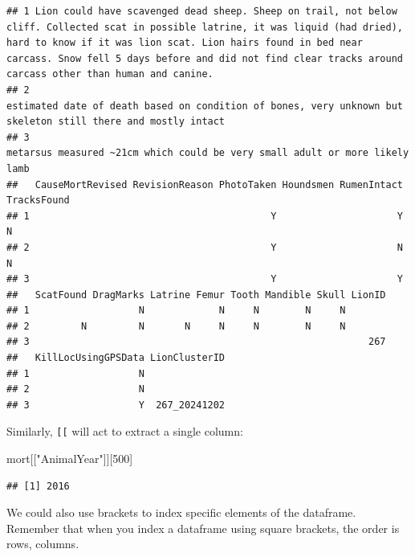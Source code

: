 \documentclass[
]{book}
\newenvironment{Shaded}{\begin{snugshade}}{\end{snugshade}}
\newcommand{\DecValTok}[1]{\textcolor[rgb]{0.00,0.00,0.81}{#1}}
\newcommand{\NormalTok}[1]{#1}
\newcommand{\StringTok}[1]{\textcolor[rgb]{0.31,0.60,0.02}{#1}}
\begin{document}
\begin{verbatim}
## 1 Lion could have scavenged dead sheep. Sheep on trail, not below cliff. Collected scat in possible latrine, it was liquid (had dried), hard to know if it was lion scat. Lion hairs found in bed near carcass. Snow fell 5 days before and did not find clear tracks around carcass other than human and canine.
## 2                                                                                                                                                                                                    estimated date of death based on condition of bones, very unknown but skeleton still there and mostly intact
## 3                                                                                                                                                                                                                                     metarsus measured ~21cm which could be very small adult or more likely lamb
##   CauseMortRevised RevisionReason PhotoTaken Houndsmen RumenIntact TracksFound
## 1                                          Y                     Y           N
## 2                                          Y                     N           N
## 3                                          Y                     Y            
##   ScatFound DragMarks Latrine Femur Tooth Mandible Skull LionID
## 1                   N             N     N        N     N       
## 2         N         N       N     N     N        N     N       
## 3                                                           267
##   KillLocUsingGPSData LionClusterID
## 1                   N              
## 2                   N              
## 3                   Y  267_20241202
\end{verbatim}

Similarly, \texttt{{[}{[}} will act to extract a single column:

\begin{Shaded}
\begin{Highlighting}[]
\NormalTok{mort[[}\StringTok{"AnimalYear"}\NormalTok{]][}\DecValTok{500}\NormalTok{]}
\end{Highlighting}
\end{Shaded}

\begin{verbatim}
## [1] 2016
\end{verbatim}

We could also use brackets to index specific elements of the dataframe. Remember that when you index a dataframe using square brackets, the order is rows, columns.
\end{document}
